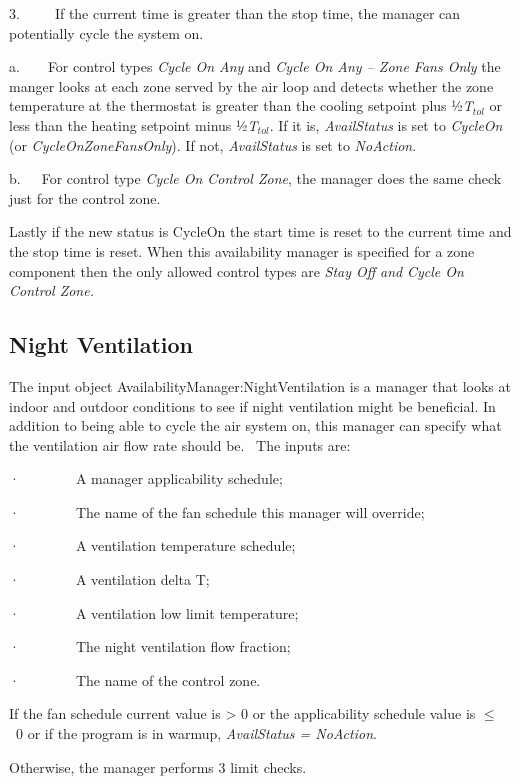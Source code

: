 3.~~~~~If the current time is greater than the stop time, the manager can potentially cycle the system on.

a.~~~~For control types \emph{Cycle On Any} and \emph{Cycle On Any -- Zone Fans Only} the manger looks at each zone served by the air loop and detects whether the zone temperature at the thermostat is greater than the cooling setpoint plus ½\emph{T\(_{tol}\)} or less than the heating setpoint minus ½\emph{T\(_{tol}\)}. If it is, \emph{AvailStatus} is set to \emph{CycleOn} (or \emph{CycleOnZoneFansOnly}). If not, \emph{AvailStatus} is set to \emph{NoAction}.

b.~~~For control type \emph{Cycle On Control Zone}, the manager does the same check just for the control zone.

Lastly if the new status is CycleOn the start time is reset to the current time and the stop time is reset. When this availability manager is specified for a zone component then the only allowed control types are \emph{Stay Off} \emph{and} \emph{Cycle On Control Zone.}

\subsection{Night Ventilation}\label{night-ventilation}

The input object AvailabilityManager:NightVentilation is a manager that looks at indoor and outdoor conditions to see if night ventilation might be beneficial. In addition to being able to cycle the air system on, this manager can specify what the ventilation air flow rate should be.~ The inputs are:

·~~~~~~~~A manager applicability schedule;

·~~~~~~~~The name of the fan schedule this manager will override;

·~~~~~~~~A ventilation temperature schedule;

·~~~~~~~~A ventilation delta T;

·~~~~~~~~A ventilation low limit temperature;

·~~~~~~~~The night ventilation flow fraction;

·~~~~~~~~The name of the control zone.

If the fan schedule current value is \textgreater{} 0 or the applicability schedule value is \(\le\) ~0 or if the program is in warmup, \emph{AvailStatus = NoAction}.

Otherwise, the manager performs 3 limit checks.

